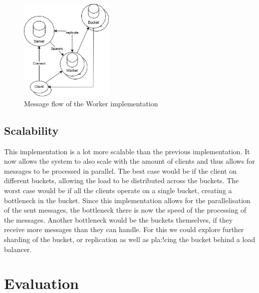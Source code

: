 \documentclass{article}
\begin{document}
\begin{figure}[H]
	\centering
	\includegraphics[width=0.4\textwidth]{worker-implementation.png}
	\caption{Message flow of the Worker implementation}
	\label{fig:worker-implementation}
\end{figure}
\subsection{Scalability}
This implementation is a lot more scalable than the previous implementation. It
now allows the system to also scale with the amount of clients and thus allows
for messages to be processed in parallel. The best case would be if the client
on different buckets, allowing the load to be distributed across the buckets.
The worst case would be if all the clients operate on a single bucket, creating
a bottleneck in the bucket. Since this implementation allows for the
parallelisation of the sent messages, the bottleneck there is now the speed of
the processing of the messages. Another bottleneck would be the buckets
themselves, if they receive more messages than they can handle. For this we
could explore further sharding of the bucket, or replication as well as pla:!cing
the bucket behind a load balancer.
\newpage
\section{Evaluation}
\end{document}
